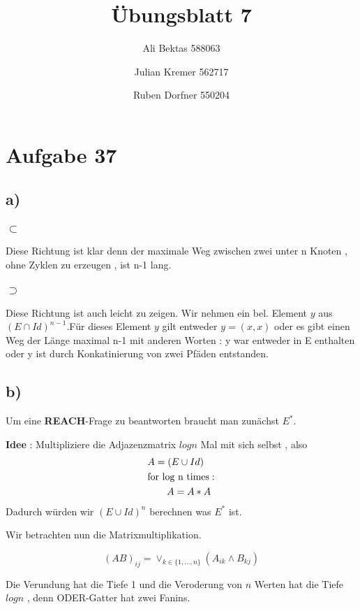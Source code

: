 \documentclass{article}
\title{Übungsblatt 7}
\author{Ali Bektas 588063 \and Julian Kremer 562717 \and Ruben Dorfner 550204}
\begin{document}
	\maketitle
	
	\section*{Aufgabe 37}
		\subsection*{a)}
			\subsubsection*{$\subset$}
				\par Diese Richtung ist klar denn der maximale Weg zwischen zwei unter n Knoten , ohne Zyklen zu erzeugen , ist n-1 lang.
			\subsubsection*{$\supset$}
				\par Diese Richtung ist auch leicht zu zeigen. Wir nehmen ein bel. Element $y$ aus $(E\cap Id)^{n-1}$.Für dieses Element $y$ gilt entweder $y=(x,x)$ oder es gibt einen Weg der Länge maximal n-1 mit anderen Worten : y war entweder in E enthalten oder y ist durch Konkatinierung von zwei Pfäden entstanden.
		\subsection*{b)}
				\par Um eine \textbf{REACH}-Frage zu beantworten braucht man zunächst $E^{*}$.

				\textbf{Idee} : Multipliziere die Adjazenzmatrix $log n$ Mal mit sich selbst , also
				\begin{align*}
				&A = (E \cup Id)\\
				&\text{for log n times} :\\ 
				&\hspace{20px}A = A * A
				\end{align*} 
				Dadurch würden wir $(E \cup Id)^{n}$ berechnen was $E^*$ ist.

				Wir betrachten nun die Matrixmultiplikation.

				\[
					(AB)_{ij} = \lor_{k \in \{ 1,\dots ,n \}} (A_{ik} \land B_{kj})
				\]

				Die Verundung hat die Tiefe 1 und die Veroderung von $n$ Werten hat die Tiefe $log n$ , denn ODER-Gatter hat zwei Fanins.
\end{document}
